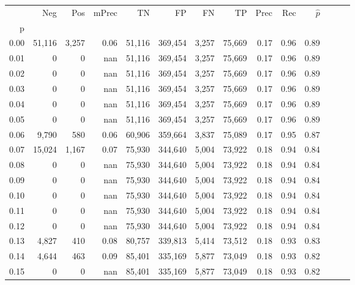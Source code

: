\begin{tabular}{rrrrrrrrrrrrrr}
\toprule
{} &     Neg &    Pos & mPrec &       TN &       FP &      FN &      TP &  Prec &   Rec & $\hat{p}$ \\
p    &         &        &       &          &          &         &         &       &       &           \\
\midrule
0.00 &  51,116 &  3,257 &  0.06 &   51,116 &  369,454 &   3,257 &  75,669 &  0.17 &  0.96 &      0.89 \\
0.01 &       0 &      0 &   nan &   51,116 &  369,454 &   3,257 &  75,669 &  0.17 &  0.96 &      0.89 \\
0.02 &       0 &      0 &   nan &   51,116 &  369,454 &   3,257 &  75,669 &  0.17 &  0.96 &      0.89 \\
0.03 &       0 &      0 &   nan &   51,116 &  369,454 &   3,257 &  75,669 &  0.17 &  0.96 &      0.89 \\
0.04 &       0 &      0 &   nan &   51,116 &  369,454 &   3,257 &  75,669 &  0.17 &  0.96 &      0.89 \\
0.05 &       0 &      0 &   nan &   51,116 &  369,454 &   3,257 &  75,669 &  0.17 &  0.96 &      0.89 \\
0.06 &   9,790 &    580 &  0.06 &   60,906 &  359,664 &   3,837 &  75,089 &  0.17 &  0.95 &      0.87 \\
0.07 &  15,024 &  1,167 &  0.07 &   75,930 &  344,640 &   5,004 &  73,922 &  0.18 &  0.94 &      0.84 \\
0.08 &       0 &      0 &   nan &   75,930 &  344,640 &   5,004 &  73,922 &  0.18 &  0.94 &      0.84 \\
0.09 &       0 &      0 &   nan &   75,930 &  344,640 &   5,004 &  73,922 &  0.18 &  0.94 &      0.84 \\
0.10 &       0 &      0 &   nan &   75,930 &  344,640 &   5,004 &  73,922 &  0.18 &  0.94 &      0.84 \\
0.11 &       0 &      0 &   nan &   75,930 &  344,640 &   5,004 &  73,922 &  0.18 &  0.94 &      0.84 \\
0.12 &       0 &      0 &   nan &   75,930 &  344,640 &   5,004 &  73,922 &  0.18 &  0.94 &      0.84 \\
0.13 &   4,827 &    410 &  0.08 &   80,757 &  339,813 &   5,414 &  73,512 &  0.18 &  0.93 &      0.83 \\
0.14 &   4,644 &    463 &  0.09 &   85,401 &  335,169 &   5,877 &  73,049 &  0.18 &  0.93 &      0.82 \\
0.15 &       0 &      0 &   nan &   85,401 &  335,169 &   5,877 &  73,049 &  0.18 &  0.93 &      0.82 \\

\end{tabular}
